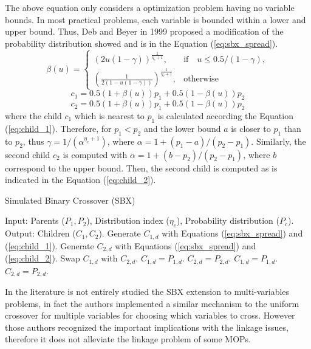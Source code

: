 The above equation only considers a optimization problem having no variable bounds.
%
In most practical problems, each variable is bounded within a lower and upper bound.
%
Thus, Deb and Beyer in 1999 \cite{deb1999self} proposed a modification of the probability distribution showed and is in the Equation (\ref{eq:sbx_spread}).
%
\begin{equation} \label{eq:sbx_spread}
    \beta(u)= 
\begin{cases}
     (2u(1-\gamma))^{\frac{1}{\eta_c+1}},& \text{if} \quad u \leq 0.5/(1-\gamma),\\
     	(\frac{1}{2(1-u(1-\gamma))})^{\frac{1}{\eta_c +1}} ,& \text{otherwise}
\end{cases}
\end{equation}
\begin{equation} \label{eq:child_1}
c_1 = 0.5(1 + \beta(u))p_1 + 0.5(1-\beta(u))p_2
\end{equation}
\begin{equation} \label{eq:child_2}
c_2 = 0.5(1 + \beta(u))p_1 + 0.5(1-\beta(u))p_2
\end{equation}
where the child $c_1$ which is nearest to $p_1$ is calculated according the Equation (\ref{eq:child_1}).
%
Therefore, for $p_1 < p_2$ and the lower bound $a$ is closer to $p_1$ than to $p_2$, thus $\gamma = 1/(\alpha^{\eta_c + 1})$, where $\alpha = 1 + (p_1 - a) / (p_2 - p_1)$.
%
Similarly, the second child $c_2$ is computed with $\alpha = 1 + (b-p_2)/(p_2 - p_1)$, where $b$ correspond to the upper bound.
%
Then, the second child is computed as is indicated in the Equation (\ref{eq:child_2}).
\begin{algorithm}[t]
\scriptsize
\caption{Simulated Binary Crossover (SBX)}
\label{alg:SBX_Operator}
\begin{algorithmic}[1]
    \STATE Input: Parents ($P_{1}, P_{2}$), Distribution index ($\eta_c$), Probability distribution ($P_c$).
    \STATE Output: Children ($C_{1}, C_{2}$).
	 \label{alg:inherit_variable}
		\STATE Generate $C_{1,d}$ with Equations (\ref{eq:sbx_spread}) and (\ref{eq:child_1}).
		\STATE Generate $C_{2,d}$ with Equations (\ref{eq:sbx_spread}) and (\ref{eq:child_2}).
			\STATE Swap $C_{1,d}$ with $C_{2,d}$.
		 \ENDIF
        \ELSE
	   \STATE $C_{1,d} = P_{1, d}$.
	   \STATE $C_{2,d} = P_{2, d}$.
        \ENDIF
       \ENDFOR
    \ELSE
	\STATE $C_{1,d} = P_{1,d}$.
	\STATE $C_{2,d} = P_{2,d}$.
    \ENDIF
\end{algorithmic}
\end{algorithm}
In the literature \cite{Joel:SBX1994} is not entirely studied the SBX extension to multi-variables problems, in fact the authors implemented a similar mechanism to the uniform crossover for multiple variables \cite{Joel:UNDX} for choosing which variables to cross.
%
However those authors recognized the important implications with the linkage issues, therefore it does not alleviate the linkage problem of some MOPs.
%

